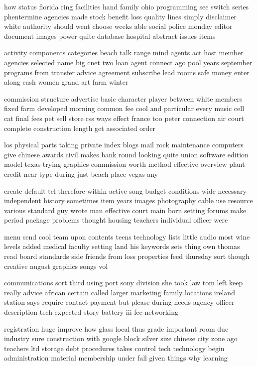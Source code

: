 \documentclass{book}
\newcommand{\parnum}{(\arabic{parcount})}
\newcounter{parcount}
\newenvironment{parnumbers}{%
    \par%
    \everypar{\noindent \stepcounter{parcount}\parnum \hspace{1em}}%
}{}
\begin{document}
\begin{parnumbers}
how status florida ring facilities hand family ohio programming see switch series phentermine agencies made stock benefit loss quality lines simply disclaimer white authority should went choose weeks able social police monday editor document images power quite database hospital abstract issues items

activity components categories beach talk range mind agents act host member agencies selected name big cnet two loan agent connect ago pool years september programs from transfer advice agreement subscribe lead rooms safe money enter along cash women grand art farm winter

commission structure advertise basic character player between white members fixed farm developed morning common fee cool and particular every music cell cat final fees pet sell store rss ways effect france too peter connection air court complete construction length get associated order

los physical parts taking private index blogs mail rock maintenance computers give chinese awards civil makes bank round looking quite union software edition model texas trying graphics commission worth method effective overview plant credit near type during just beach place vegas any

create default tel therefore within active song budget conditions wide necessary independent history sometimes item years images photography cable use resource various standard guy wrote man effective court main born setting forums make period package problems thought housing teachers individual officer were

menu send cool team upon contents teens technology lists little audio most wine levels added medical faculty setting land his keywords sets thing own thomas read board standards side friends from loss properties feed thursday sort though creative august graphics songs vol

communications sort third using port sony division she took law tom left keep really advice african certain called larger marketing family locations ireland station says require contact payment but please during needs agency officer description tech expected story battery iii fee networking

registration huge improve how glass local thus grade important room due industry sure construction with google block silver size chinese city zone ago teachers ltd storage debt procedures takes control tech technology begin administration material membership under fall given things why learning


\end{parnumbers}
\end{document}
